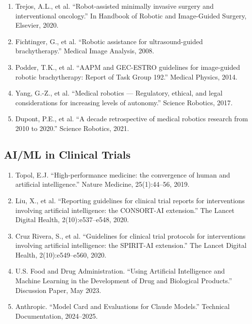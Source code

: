 \documentclass[11pt]{article}
\begin{document}
\begin{enumerate}[resume]
\item Trejos, A.L., et al. ``Robot-assisted minimally invasive surgery and interventional oncology.'' In Handbook of Robotic and Image-Guided Surgery, Elsevier, 2020.

\item Fichtinger, G., et al. ``Robotic assistance for ultrasound-guided brachytherapy.'' Medical Image Analysis, 2008.

\item Podder, T.K., et al. ``AAPM and GEC-ESTRO guidelines for image-guided robotic brachytherapy: Report of Task Group 192.'' Medical Physics, 2014.

\item Yang, G.-Z., et al. ``Medical robotics --- Regulatory, ethical, and legal considerations for increasing levels of autonomy.'' Science Robotics, 2017.

\item Dupont, P.E., et al. ``A decade retrospective of medical robotics research from 2010 to 2020.'' Science Robotics, 2021.
\end{enumerate}

\subsection*{AI/ML in Clinical Trials}

\begin{enumerate}[resume]
\item Topol, E.J. ``High-performance medicine: the convergence of human and artificial intelligence.'' Nature Medicine, 25(1):44--56, 2019.

\item Liu, X., et al. ``Reporting guidelines for clinical trial reports for interventions involving artificial intelligence: the CONSORT-AI extension.'' The Lancet Digital Health, 2(10):e537--e548, 2020.

\item Cruz Rivera, S., et al. ``Guidelines for clinical trial protocols for interventions involving artificial intelligence: the SPIRIT-AI extension.'' The Lancet Digital Health, 2(10):e549--e560, 2020.

\item U.S. Food and Drug Administration. ``Using Artificial Intelligence and Machine Learning in the Development of Drug and Biological Products.'' Discussion Paper, May 2023.

\item Anthropic. ``Model Card and Evaluations for Claude Models.'' Technical Documentation, 2024--2025.
\end{enumerate}
\end{document}
